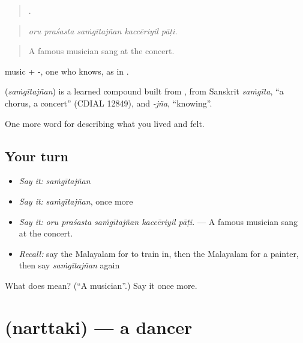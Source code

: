 \begin{quote}
    .
\end{quote}

\begin{quote}
\emph{oru praśasta saṁgītajñan kaccēriyil pāṭi.}
\end{quote}

\begin{quote}
A famous musician sang at the concert.
\end{quote}

 music + -, one who knows, as in .

\begin{cousinweb}
\textbf{} (\emph{saṁgītajñan}) is a learned compound built from , from Sanskrit \emph{saṁgīta}, \textquotedblleft{}a chorus, a concert\textquotedblright{} (CDIAL 12849), and \emph{-jña}, \textquotedblleft{}knowing\textquotedblright{}.
\end{cousinweb}

\begin{grammarlens}[title={What you've built}]
One more word for describing what you lived and felt.
\end{grammarlens}

\subsection*{Your turn}
\begin{itemize}
\raggedright
  \item \emph{Say it:} \emph{saṁgītajñan}
  \item \emph{Say it:} \emph{saṁgītajñan}, once more
  \item \emph{Say it:} \emph{oru praśasta saṁgītajñan kaccēriyil pāṭi.} — A famous musician sang at the concert.
  \item \emph{Recall:} say the Malayalam for to train in, then the Malayalam for a painter, then say \emph{saṁgītajñan} again
\end{itemize}

\begin{tcolorbox}[breakable,colback=teal!4,colframe=teal!35!black,title={Before you move on}]
What does  mean? (\textquotedblleft{}A musician\textquotedblright{}.) Say it once more.
\end{tcolorbox}
\section[\texorpdfstring{\ml{നർത്തകി} (narttaki)}{നർത്തകി (narttaki)}]{ (narttaki) — a dancer}

